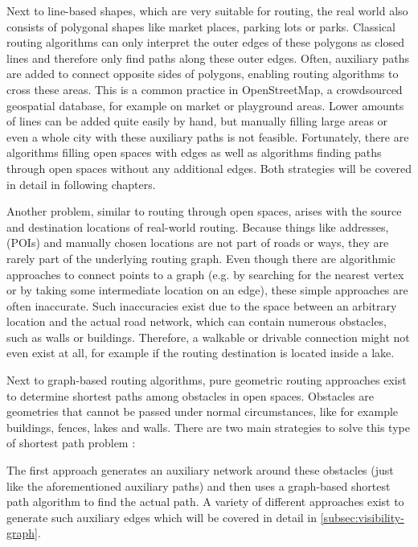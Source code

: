 	Next to line-based shapes, which are very suitable for routing, the real world also consists of polygonal shapes like market places, parking lots or parks.
	Classical routing algorithms can only interpret the outer edges of these polygons as closed lines and therefore only find paths along these outer edges.
	Often, auxiliary paths are added to connect opposite sides of polygons, enabling routing algorithms to cross these areas.
	This is a common practice in OpenStreetMap, a crowdsourced geospatial database, for example on market or playground areas.
	Lower amounts of lines can be added quite easily by hand, but manually filling large areas or even a whole city with these auxiliary paths is not feasible.
	Fortunately, there are algorithms filling open spaces with edges as well as algorithms finding paths through open spaces without any additional edges.
	Both strategies will be covered in detail in following chapters.
	
	Another problem, similar to routing through open spaces, arises with the source and destination locations of real-world routing.
	Because things like addresses,  (POIs) and manually chosen locations are not part of roads or ways, they are rarely part of the underlying routing graph.
	Even though there are algorithmic approaches to connect points to a graph (e.g. by searching for the nearest vertex or by taking some intermediate location on an edge), these simple approaches are often inaccurate.
	Such inaccuracies exist due to the space between an arbitrary location and the actual road network, which can contain numerous obstacles, such as walls or buildings.
	Therefore, a walkable or drivable connection might not even exist at all, for example if the routing destination is located inside a lake.
	
	Next to graph-based routing algorithms, pure geometric routing approaches exist to determine shortest paths among obstacles in open spaces.
	Obstacles are geometries that cannot be passed under normal circumstances, like for example buildings, fences, lakes and walls.
	There are two main strategies to solve this type of shortest path problem \cite{hershberger-suri}:
	
	The first approach generates an auxiliary network around these obstacles (just like the aforementioned auxiliary paths) and then uses a graph-based shortest path algorithm to find the actual path.
	A variety of different approaches exist to generate such auxiliary edges\cite{graser-osm-open-spaces} which will be covered in detail in \cref{subsec:visibility-graph}.
	
